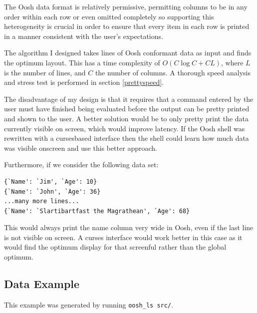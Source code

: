 \documentclass[12pt,twoside,notitlepage]{report}
\begin{document}
The Oosh data format is relatively permissive, permitting columns to
be in any order within each row or even omitted completely so
supporting this heterogeneity is crucial in order to ensure that every
item in each row is printed in a manner consistent with the user's
expectations.

The algorithm I designed takes lines of Oosh conformant data as input
and finds the optimum layout. This has a time complexity of $O(C \log
C + CL)$, where $L$ is the number of lines, and $C$ the number of
columns. A thorough speed analysis and stress test is performed in
section \ref{prettyspeed}.

The disadvantage of my design is that it requires that a command
entered by the user must have finished being evaluated before the
output can be pretty printed and shown to the user. A better solution
would be to only pretty print the data currently visible on screen,
which would improve latency. If the Oosh shell was rewritten with a
curses\footnotemark[2] based interface then the shell could learn how
much data was visible onscreen and use this better approach.

Furthermore, if we consider the following data set:


\begin{verbatim}
{`Name': `Jim', `Age': 10}
{`Name': `John', `Age': 36}
...many more lines...
{`Name': `Slartibartfast the Magrathean', `Age': 68}
\end{verbatim}

This would always print the name column very wide in Oosh, even if the last
line is not visible on screen. A curses interface would work better in
this case as it would find the optimum display for that screenful
rather than the global optimum.



\subsection{Data Example}

This example was generated by running {\tt oosh\_ls src/}.
\end{document}
